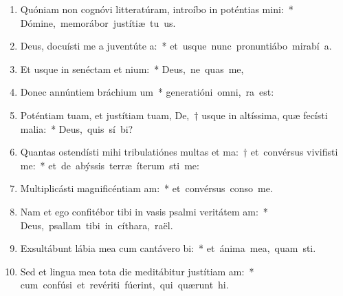 \begin{flushleft}
\begin{enumerate}[leftmargin=*]
\item Quóniam non cognóvi litteratúram, introíbo in poténtias mini:~* \mbox{Dómine, memorábor justítiæ tu us.}
\item Deus, docuísti me a juventúte a:~* \mbox{et usque nunc pronuntiábo mirabí a.}
\item Et usque in senéctam et nium:~* \mbox{Deus, ne quas me,}
\item Donec annúntiem bráchium um~* \mbox{generatióni omni,  ra est:}
\item Poténtiam tuam, et justítiam tuam, De,~† usque in altíssima, quæ fecísti malia:~* \mbox{Deus, quis sí bi?}
\item Quantas ostendísti mihi tribulatiónes multas et ma:~† et~convérsus vivifisti me:~* \mbox{et de abýssis terræ íterum sti me:}
\item Multiplicásti magnificéntiam am:~* \mbox{et convérsus conso  me.}
\item Nam et ego confitébor tibi in vasis psalmi veritátem am:~* \mbox{Deus, psallam tibi in cíthara,  raël.}
\item Exsultábunt lábia mea cum cantávero bi:~* \mbox{et ánima mea, quam sti.}
\item Sed et lingua mea tota die meditábitur justítiam am:~* \mbox{cum confúsi et revériti fúerint, qui quærunt  hi.}

\end{enumerate}
\end{flushleft}

